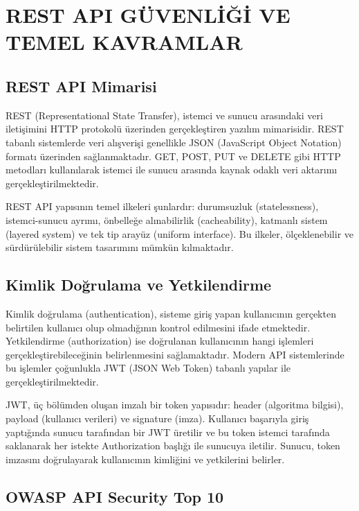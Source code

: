 \section{REST API GÜVENLİĞİ VE TEMEL KAVRAMLAR}
\label{bolum2}

\subsection{REST API Mimarisi}
\label{rest-api-mimarisi}

REST (Representational State Transfer), istemci ve sunucu arasındaki veri iletişimini HTTP protokolü üzerinden gerçekleştiren yazılım mimarisidir. REST tabanlı sistemlerde veri alışverişi genellikle JSON (JavaScript Object Notation) formatı üzerinden sağlanmaktadır. GET, POST, PUT ve DELETE gibi HTTP metodları kullanılarak istemci ile sunucu arasında kaynak odaklı veri aktarımı gerçekleştirilmektedir.

REST API yapısının temel ilkeleri şunlardır: durumsuzluk (statelessness), istemci-sunucu ayrımı, önbelleğe alınabilirlik (cacheability), katmanlı sistem (layered system) ve tek tip arayüz (uniform interface). Bu ilkeler, ölçeklenebilir ve sürdürülebilir sistem tasarımını mümkün kılmaktadır.

\subsection{Kimlik Doğrulama ve Yetkilendirme}
\label{kimlik-do-rulama-ve-yetkilendirme}

Kimlik doğrulama (authentication), sisteme giriş yapan kullanıcının gerçekten belirtilen kullanıcı olup olmadığının kontrol edilmesini ifade etmektedir. Yetkilendirme (authorization) ise doğrulanan kullanıcının hangi işlemleri gerçekleştirebileceğinin belirlenmesini sağlamaktadır. Modern API sistemlerinde bu işlemler çoğunlukla JWT (JSON Web Token) tabanlı yapılar ile gerçekleştirilmektedir.

JWT, üç bölümden oluşan imzalı bir token yapısıdır: header (algoritma bilgisi), payload (kullanıcı verileri) ve signature (imza). Kullanıcı başarıyla giriş yaptığında sunucu tarafından bir JWT üretilir ve bu token istemci tarafında saklanarak her istekte Authorization başlığı ile sunucuya iletilir. Sunucu, token imzasını doğrulayarak kullanıcının kimliğini ve yetkilerini belirler.

\subsection{OWASP API Security Top 10}
\label{owasp-top10}

